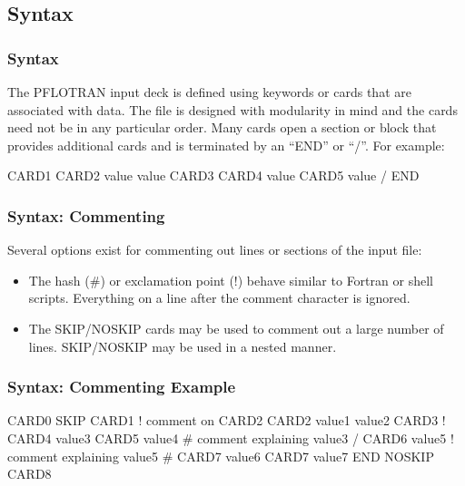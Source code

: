 \subsection{Syntax}

\begin{frame}\frametitle{Syntax}

The PFLOTRAN input deck is defined using keywords or cards that are associated with data.  The file is designed with modularity in mind and the cards need not be in any particular order.  Many cards open a section or block that provides additional cards and is terminated by an ``END'' or ``/''.  For example:

\begin{semiverbatim}
CARD1
  CARD2 value value
  CARD3
    CARD4 value
    CARD5 value
  /
END
\end{semiverbatim}

\end{frame}

\begin{frame}[fragile]\frametitle{Syntax: Commenting}
Several options exist for commenting out lines or sections of the input file:
\begin{itemize}
\item The hash (\#) or exclamation point (!) behave similar to Fortran or shell scripts.  Everything on a line after the comment character is ignored.
\item The SKIP/NOSKIP cards may be used to comment out a large number of lines.  SKIP/NOSKIP may be used in a nested manner.  
\end{itemize}

\end{frame}

\begin{frame}[containsverbatim]\frametitle{Syntax: Commenting Example}

\begin{semiverbatim}
CARD0
SKIP
CARD1
  ! comment on CARD2
  CARD2 value1 value2
  CARD3
  !  CARD4 value3 
    CARD5 value4 # comment explaining value3
  /
  CARD6 value5 ! comment explaining value5
#  CARD7 value6
  CARD7 value7
END
NOSKIP
CARD8
\end{semiverbatim}

\end{frame}
